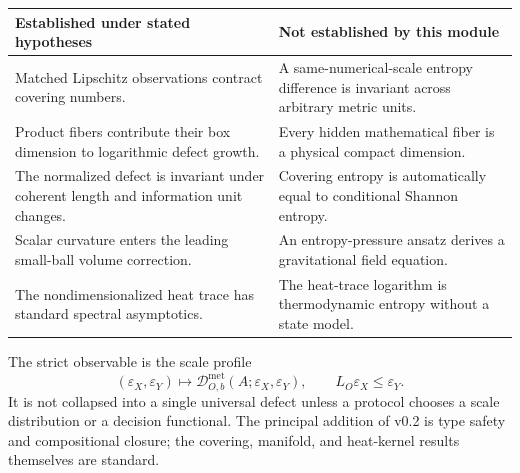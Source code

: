 \documentclass[11pt,a4paper]{article}
\theoremstyle{definition}
\theoremstyle{plain}
\theoremstyle{remark}
\newcommand{\Dmet}{\mathscr{D}^{\mathrm{met}}}
\begin{document}
\begin{center}
\small
\begin{tabularx}{\linewidth}{@{}YY@{}}
\toprule
Established under stated hypotheses & Not established by this module\\
\midrule
Matched Lipschitz observations contract covering numbers.
&
A same-numerical-scale entropy difference is invariant across arbitrary
metric units.\\
Product fibers contribute their box dimension to logarithmic defect growth.
&
Every hidden mathematical fiber is a physical compact dimension.\\
The normalized defect is invariant under coherent length and information
unit changes.
&
Covering entropy is automatically equal to conditional Shannon entropy.\\
Scalar curvature enters the leading small-ball volume correction.
&
An entropy-pressure ansatz derives a gravitational field equation.\\
The nondimensionalized heat trace has standard spectral asymptotics.
&
The heat-trace logarithm is thermodynamic entropy without a state model.\\
\bottomrule
\end{tabularx}
\end{center}

The strict observable is the scale profile
\[
\boxed{
(\varepsilon_X,\varepsilon_Y)
\longmapsto
\Dmet_{O,b}(A;\varepsilon_X,\varepsilon_Y),
\qquad
L_O\varepsilon_X\leq\varepsilon_Y.
}
\]
It is not collapsed into a single universal defect unless a protocol
chooses a scale distribution or a decision functional. The principal
addition of v0.2 is type safety and compositional closure; the covering,
manifold, and heat-kernel results themselves are standard.
\end{document}

